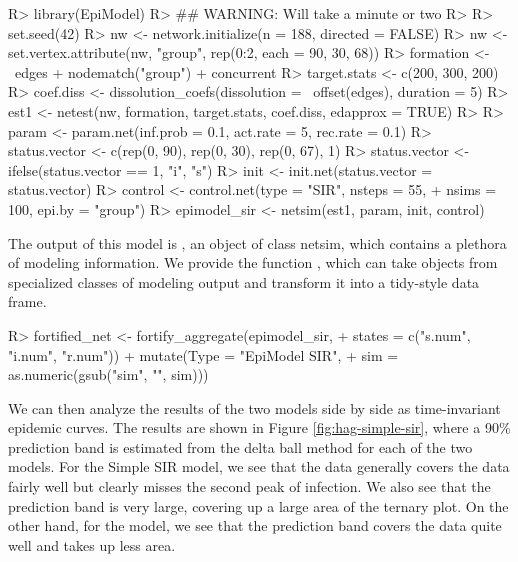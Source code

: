 \documentclass[
  shortnames]{jss}
\begin{document}
\begin{CodeChunk}
\begin{CodeInput}
R> library(EpiModel)
R> ## WARNING:  Will take a minute or two
R> 
R> set.seed(42)
R> nw <- network.initialize(n = 188, directed = FALSE)
R> nw <- set.vertex.attribute(nw, "group", rep(0:2, each = 90, 30, 68))
R> formation <- ~edges + nodematch("group") + concurrent
R> target.stats <- c(200, 300, 200)
R> coef.diss <- dissolution_coefs(dissolution = ~offset(edges),  duration = 5)
R> est1 <- netest(nw, formation, target.stats, coef.diss, edapprox = TRUE)
R> 
R> param <- param.net(inf.prob = 0.1, act.rate = 5, rec.rate = 0.1)
R> status.vector <- c(rep(0, 90), rep(0, 30), rep(0, 67), 1)
R> status.vector <- ifelse(status.vector == 1, "i", "s")
R> init <- init.net(status.vector = status.vector)
R> control <- control.net(type = "SIR", nsteps = 55,
+                        nsims = 100, epi.by = "group")
R> epimodel_sir <- netsim(est1, param, init, control)
\end{CodeInput}
\end{CodeChunk}

The output of this model is , an object of class
netsim, which contains a plethora of modeling information. We provide
the function , which can take objects from
specialized classes of modeling output and transform it into a
tidy-style data frame.

\begin{CodeChunk}
\begin{CodeInput}
R> fortified_net <- fortify_aggregate(epimodel_sir, 
+                                    states = c("s.num", "i.num", "r.num")) %
+   mutate(Type = "EpiModel SIR",
+          sim = as.numeric(gsub("sim", "", sim)))
\end{CodeInput}
\end{CodeChunk}

We can then analyze the results of the two models side by side as
time-invariant epidemic curves. The results are shown in Figure
\ref{fig:hag-simple-sir}, where a 90\% prediction band is estimated from
the delta ball method for each of the two models. For the Simple SIR
model, we see that the data generally covers the data fairly well but
clearly misses the second peak of infection. We also see that the
prediction band is very large, covering up a large area of the ternary
plot. On the other hand, for the  model, we see that the
prediction band covers the data quite well and takes up less area.
\end{document}
